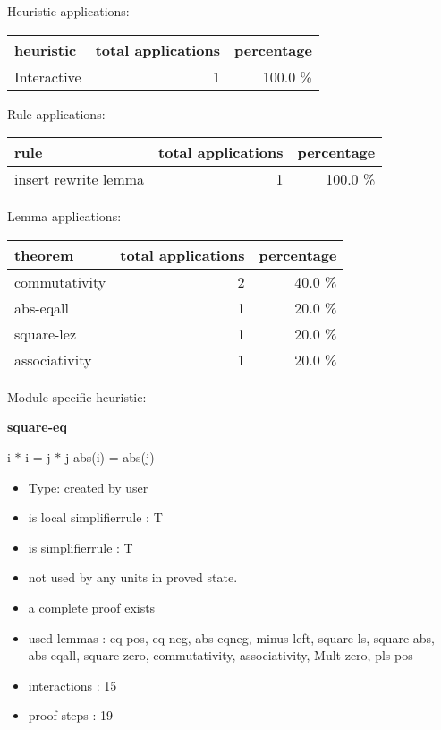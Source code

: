 \documentclass[a4paper]{article}
\begin{document}
Heuristic applications:

\begin{supertabular}{l|r|r}
heuristic	& total applications & percentage \\ \hline
Interactive & 1 & 100.0 \% \\

\end{supertabular}

Rule applications:

\begin{supertabular}{l|r|r}
rule	        & total applications & percentage \\ \hline
insert rewrite lemma & 1 & 100.0 \% \\

\end{supertabular}

Lemma applications:

\begin{supertabular}{l|r|r}
theorem	        & total applications & percentage \\ \hline
commutativity & 2 & 40.0 \% \\
abs-eqall & 1 & 20.0 \% \\
square-lez & 1 & 20.0 \% \\
associativity & 1 & 20.0 \% \\

\end{supertabular}

Module specific heuristic:

\pagebreak

{\LARGE\bf square-eq}\label{lemma-square-eq}

\medskip

 \Fol i $*$ i = j $*$ j \Equiv abs(i) = abs(j)

\begin{itemize}

\item Type: created by user

\item is local simplifierrule : T
\item is simplifierrule : T
\item not used by any units in proved state.
\item       a complete proof exists
\item       used lemmas  : eq-pos, eq-neg, abs-eqneg, minus-left, square-ls, square-abs, abs-eqall, square-zero, commutativity, associativity, Mult-zero, pls-pos
\item       interactions : 15
\item       proof steps  : 19
\end{itemize}
\end{document}
